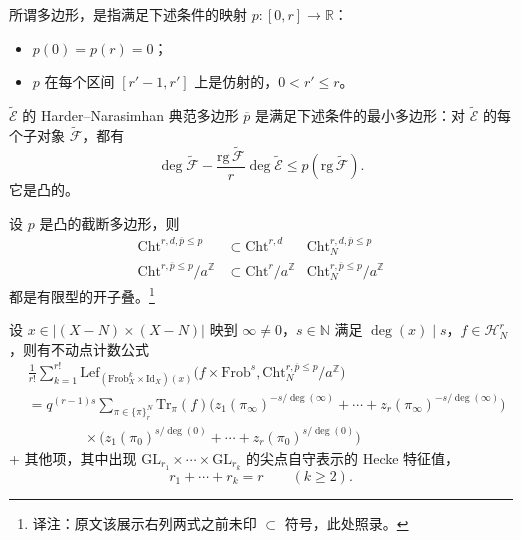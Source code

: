所谓多边形，是指满足下述条件的映射 $p : [0, r] \to \mathbb{R}$：
\begin{itemize}
\item $p(0) = p(r) = 0$；
\item $p$ 在每个区间 $[r' - 1, r']$ 上是仿射的，$0 < r' \le r$。
\end{itemize}

$\tilde{\mathcal{E}}$ 的 Harder--Narasimhan 典范多边形 $\overline{p}$ 是满足下述条件的最小多边形：对 $\tilde{\mathcal{E}}$ 的每个子对象 $\tilde{\mathcal{F}}$，都有
\[ \deg\tilde{\mathcal{F}} - \frac{\mathrm{rg}\,\tilde{\mathcal{F}}}{r}\deg\tilde{\mathcal{E}} \le p(\mathrm{rg}\,\tilde{\mathcal{F}}). \]
它是凸的。

\begin{proposition*}
设 $p$ 是凸的截断多边形，则
\[
\begin{aligned}
\mathrm{Cht}^{r,d,\overline{p}\le p} &\subset \mathrm{Cht}^{r,d} & \mathrm{Cht}^{r,d,\overline{p}\le p}_N\\
\mathrm{Cht}^{r,\overline{p}\le p}/a^{\mathbb{Z}} &\subset \mathrm{Cht}^r/a^{\mathbb{Z}} & \mathrm{Cht}^{r,\overline{p}\le p}_N/a^{\mathbb{Z}}
\end{aligned}
\]
都是有限型的开子叠。\footnote{译注：原文该展示右列两式之前未印 $\subset$ 符号，此处照录。}
\end{proposition*}

\begin{theorem*}
设 $x \in |(X - N) \times (X - N)|$ 映到 $\infty \neq 0$，$s \in \mathbb{N}$ 满足 $\deg(x) \mid s$，$f \in \mathcal{H}^r_N$，则有不动点计数公式
\[
\begin{aligned}
&\frac{1}{r!}\sum_{k=1}^{r!} \mathrm{Lef}_{(\mathrm{Frob}^k_X \times \mathrm{Id}_X)(x)}\big(f \times \mathrm{Frob}^s, \mathrm{Cht}^{r,\overline{p}\le p}_N/a^{\mathbb{Z}}\big)\\[4pt]
&= q^{(r-1)s} \sum_{\pi \in \{\pi\}^N_r} \mathrm{Tr}_\pi(f)\big(z_1(\pi_\infty)^{-s/\deg(\infty)} + \cdots + z_r(\pi_\infty)^{-s/\deg(\infty)}\big)\\[4pt]
&\qquad\qquad \times \big(z_1(\pi_0)^{s/\deg(0)} + \cdots + z_r(\pi_0)^{s/\deg(0)}\big)
\end{aligned}
\]
+ 其他项，其中出现 $\mathrm{GL}_{r_1} \times \cdots \times \mathrm{GL}_{r_k}$ 的尖点自守表示的 Hecke 特征值，
\[ r_1 + \cdots + r_k = r \qquad (k \ge 2). \]
\end{theorem*}

